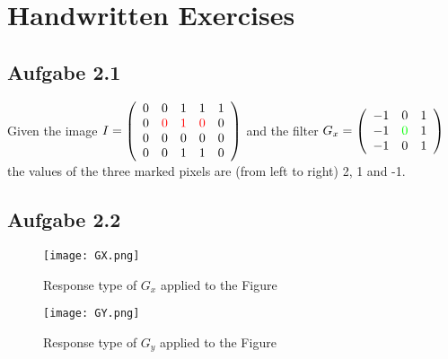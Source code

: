 \documentclass[12pt,a4paper]{article}
\begin{document}
\setlength{\parindent}{0pt}



\section{Handwritten Exercises}

\subsection{Aufgabe 2.1}
Given the image $I = \left( \begin{array}{rrrrr}0 & 0 & 1 & 1 & 1 \\0 & \color{red}0 & \color{red}1 & \color{red}0 & 0\\0 & 0 & 0 & 0 & 0\\0 & 0 & 1 & 1 & 0\\\end{array}\right) $ and the filter $G_x = \left( \begin{array}{rrr}-1 & 0 & 1\\-1 & \color{green}0 & 1\\-1 & 0 & 1\\\end{array}\right)$ the values of the three marked pixels are (from left to right) 2, 1 and -1.

\subsection{Aufgabe 2.2}
\begin{figure}[h]
	\begin{center}
		\texttt{[image: GX.png]}
		\caption{Response type of $G_x$ applied to the Figure} 
	\end{center}
\end{figure}

\begin{figure}[h]
	\begin{center}
		\texttt{[image: GY.png]}
		\caption{Response type of $G_y$ applied to the Figure} 
	\end{center}
\end{figure}
\end{document}
